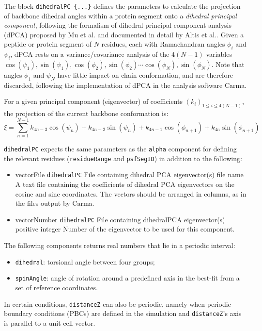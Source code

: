 {
The block \texttt{dihedralPC~\{...\}} defines the
parameters to calculate the projection of backbone dihedral angles within
a protein segment onto a \emph{dihedral principal component}, following
the formalism of dihedral principal component analysis (dPCA) proposed by
Mu et al.\cite{Mu2005} and documented in detail by Altis et
al.\cite{Altis2007}.
Given a peptide or protein segment of $N$ residues, each with Ramachandran
angles $\phi_i$ and $\psi_i$, dPCA rests on a variance/covariance analysis
of the $4(N-1)$ variables $\cos(\psi_1), \sin(\psi_1), \cos(\phi_2), \sin(\phi_2)
\cdots \cos(\phi_N), \sin(\phi_N)$. Note that angles $\phi_1$ and $\psi_N$
have little impact on chain conformation, and are therefore discarded,
following the implementation of dPCA in the analysis software Carma.\cite{Glykos2006}

For a given principal component (eigenvector) of coefficients
$(k_i)_{1 \leq i \leq 4(N-1)}$,
the projection of the current backbone conformation is:
\begin{equation}
\xi = \sum_{n=1}^{N-1} k_{4n-3} \cos(\psi_n) + k_{4n-2} \sin (\psi_n)
+ k_{4n-1} \cos (\phi_{n+1}) + k_{4n} \sin(\phi_{n+1})
\end{equation}

\texttt{dihedralPC} expects the same parameters as the \texttt{alpha}
component for defining the relevant residues (\texttt{residueRange}
and \texttt{psfSegID}) in addition to the following:

\begin{itemize}
\item %
  \key
    {vectorFile}{%
    \texttt{dihedralPC}}{%
    File containing dihedral PCA eigenvector(s)}{%
    file name}{%
    A text file containing the coefficients of dihedral PCA eigenvectors on the
    cosine and sine coordinates. The vectors should be arranged in columns,
    as in the files output by Carma.\cite{Glykos2006}}

\item %
  \key
    {vectorNumber}{%
    \texttt{dihedralPC}}{%
    File containing dihedralPCA eigenvector(s)}{%
    positive integer}{%
    Number of the eigenvector to be used for this component.}
\end{itemize}

} %



The following components returns
real numbers that lie in a periodic interval:
\begin{itemize}
\item \texttt{dihedral}: torsional angle between four groups;
\item \texttt{spinAngle}: angle of rotation around a predefined axis
  in the best-fit from a set of reference coordinates.
\end{itemize}
In certain conditions, \texttt{distanceZ} can also be periodic, namely
when periodic boundary conditions (PBCs) are defined in the simulation
and \texttt{distanceZ}'s axis is parallel to a unit cell vector.

